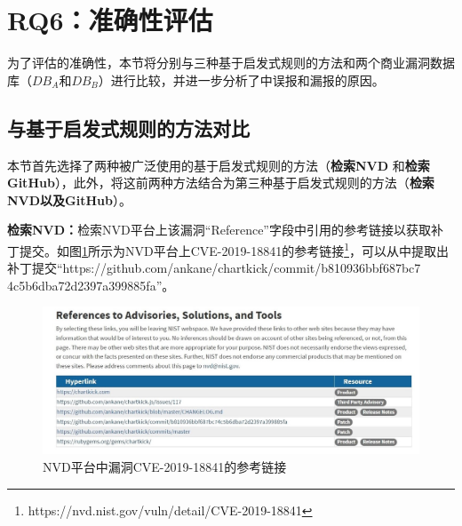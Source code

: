 

\section{RQ6：准确性评估}\label{sec:accuracy-evaluation}

为了评估\tool 的准确性，本节将\tool 分别与三种基于启发式规则的方法和两个商业漏洞数据库（$DB_A$和$DB_B$）进行比较，并进一步分析了\tool 中误报和漏报的原因。

\subsection{与基于启发式规则的方法对比}
本节首先选择了两种被广泛使用的基于启发式规则的方法（\textbf{检索NVD}\cite{duan2019automating,li2016vulpecker,li2018vuldeepecker} 和\textbf{检索GitHub}\cite{you2017semfuzz,Wang2020empirical}），此外，将这前两种方法结合为第三种基于启发式规则的方法（\textbf{检索NVD以及GitHub}）。

\textbf{检索NVD：}检索NVD平台上该漏洞“Reference”字段中引用的参考链接以获取补丁提交。如图\ref{fig:CVE-2019-18841}所示为NVD平台上CVE-2019-18841的参考链接\footnote{https://nvd.nist.gov/vuln/detail/CVE-2019-18841}，可以从中提取出补丁提交“https://github.com/ankane/chartkick/commit/b810936bbf687bc7\\4c5b6dba72d2397a399885fa”。
\begin{figure}[!t]
    \centering
    \includegraphics[scale=0.44]{fig/NVD-2019-18841}
    \caption{NVD平台中漏洞CVE-2019-18841的参考链接}\label{fig:CVE-2019-18841}
\end{figure}

